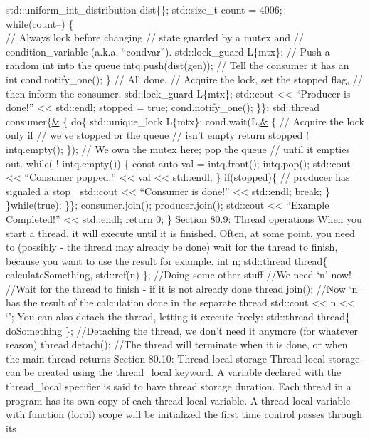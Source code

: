std::uniform\_int\_distribution dist\{\}; std::size\_t count = 4006;\\
while(count--) \{\\
// Always lock before changing // state guarded by a mutex and //
condition\_variable (a.k.a. ``condvar''). std::lock\_guard L\{mtx\}; //
Push a random int into the queue intq.push(dist(gen)); // Tell the
consumer it has an int cond.notify\_one(); \} // All done. // Acquire
the lock, set the stopped flag, // then inform the consumer.
std::lock\_guard L\{mtx\}; std::cout \textless\textless{} ``Producer is
done!'' \textless\textless{} std::endl; stopped = true;
cond.notify\_one(); \}\}; std::thread consumer\{\href{}{\&} \{ do\{
std::unique\_lock L\{mtx\}; cond.wait(L,\href{}{\&} \{ // Acquire the
lock only if // we've stopped or the queue // isn't empty return stopped
\textbar\textbar{} ! intq.empty(); \}); // We own the mutex here; pop
the queue // until it empties out. while( ! intq.empty()) \{ const auto
val = intq.front(); intq.pop(); std::cout \textless\textless{}
``Consumer popped:'' \textless\textless{} val \textless\textless{}
std::endl; \} if(stopped)\{ // producer has signaled a stop  std::cout
\textless\textless{} ``Consumer is done!'' \textless\textless{}
std::endl; break; \} \}while(true); \}\}; consumer.join();
producer.join(); std::cout \textless\textless{} ``Example Completed!''
\textless\textless{} std::endl; return 0; \} Section 80.9: Thread
operations When you start a thread, it will execute until it is ﬁnished.
Often, at some point, you need to (possibly - the thread may already be
done) wait for the thread to ﬁnish, because you want to use the result
for example. int n; std::thread thread\{ calculateSomething, std::ref(n)
\}; //Doing some other stuff //We need `n' now! //Wait for the thread to
finish - if it is not already done thread.join(); //Now `n' has the
result of the calculation done in the separate thread std::cout
\textless\textless{} n \textless\textless{} `\n'; You can also detach
the thread, letting it execute freely: std::thread thread\{ doSomething
\}; //Detaching the thread, we don't need it anymore (for whatever
reason) thread.detach(); //The thread will terminate when it is done, or
when the main thread returns Section 80.10: Thread-local storage
Thread-local storage can be created using the thread\_local keyword. A
variable declared with the thread\_local speciﬁer is said to have thread
storage duration. Each thread in a program has its own copy of each
thread-local variable. A thread-local variable with function (local)
scope will be initialized the ﬁrst time control passes through its
